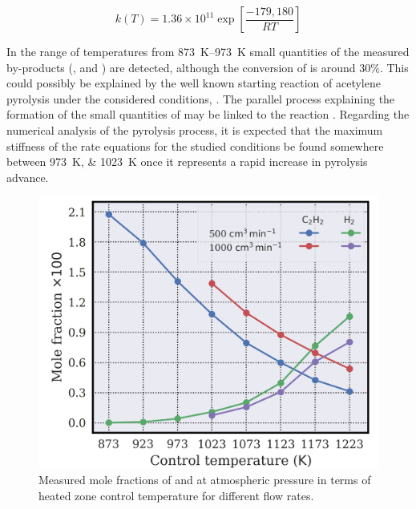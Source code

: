 \documentclass[final,3p,times,twocolumn,sort&compress]{elsarticle}
\begin{document}
\begin{equation}
	k(T) = 1.36\times{}10^{11}\exp\left[\frac{-179,180}{RT}\right]
	\label{equ:acetylene-global rate}
\end{equation}

In the range of temperatures from \SIrange{873}{973}{\kelvin} small quantities of the measured by-products (,  and ) are detected, although the conversion of  is around 30\%. This could possibly be explained by the well known starting reaction of acetylene pyrolysis under the considered conditions, . The parallel process explaining the formation of the small quantities of  may be linked to the reaction . Regarding the numerical analysis of the pyrolysis process, it is expected that the maximum stiffness of the rate equations for the studied conditions be found somewhere between \SIlist{973;1023}{\kelvin} once it represents a rapid increase in pyrolysis advance.


\begin{figure}[h]
	\centering
	\includegraphics[width=\linewidth]
	{reworking/fractions_atmospheric_pressure_main}
	\caption{\label{fig:fractions-atmospheric-pressure-main}Measured mole fractions of  and  at atmospheric pressure in terms of heated zone control temperature for different flow rates.}
\end{figure}
\end{document}
